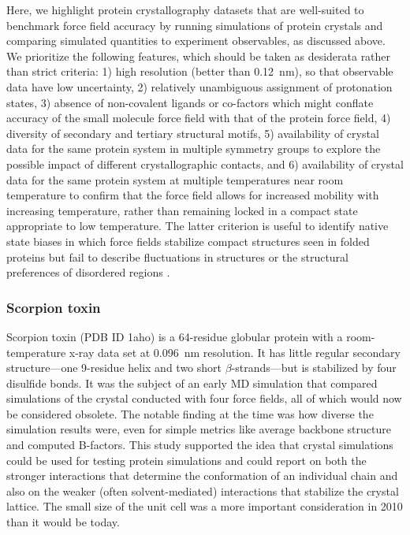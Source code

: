 \documentclass[9pt,review]{livecoms}
\begin{document}
Here, we highlight protein crystallography datasets that are well-suited to benchmark force field accuracy by running simulations of protein crystals and comparing simulated quantities to experiment observables, as discussed above.
We prioritize the following features, which should be taken as desiderata rather than strict criteria: 1) high resolution (better than \qty{0.12}{\nano\meter}), so that observable data have low uncertainty, 2) relatively unambiguous assignment of protonation states, 3) absence of non-covalent ligands or co-factors which might conflate accuracy of the small molecule force field with that of the protein force field, 4) diversity of secondary and tertiary structural motifs, 5) availability of crystal data for the same protein system in multiple symmetry groups to explore the possible impact of different crystallographic contacts, and 6) availability of crystal data for the same protein system at multiple temperatures near room temperature to confirm that the force field allows for increased mobility with increasing temperature, rather than remaining locked in a compact state appropriate to low temperature.
The latter criterion is useful to identify native state biases in which force fields stabilize compact structures seen in folded proteins but fail to describe fluctuations in structures or the structural preferences of disordered regions \cite{best_are_2008}.

\subsubsection{Scorpion toxin}
\label{sub2:scorption_toxin}

Scorpion toxin (PDB ID 1aho) is a 64-residue globular protein with a room-temperature x-ray data set at \qty{0.096}{\nano\meter} resolution.
It has little regular secondary structure---one 9-residue helix and two short $\beta$-strands---but is stabilized by four disulfide bonds.
It was the subject of an early MD simulation\cite{cerutti_simulations_2010} that compared simulations of the crystal conducted with four force fields, all of which would now be considered obsolete.
The notable finding at the time was how diverse the simulation results were, even for simple metrics like average backbone structure and computed B-factors.
This study supported the idea that crystal simulations could be used for testing protein simulations and could report on both the stronger interactions that determine the conformation of an individual chain and also on the weaker (often solvent-mediated) interactions that stabilize the crystal lattice.
The small size of the unit cell was a more important consideration in 2010 than it would be today.
\end{document}
